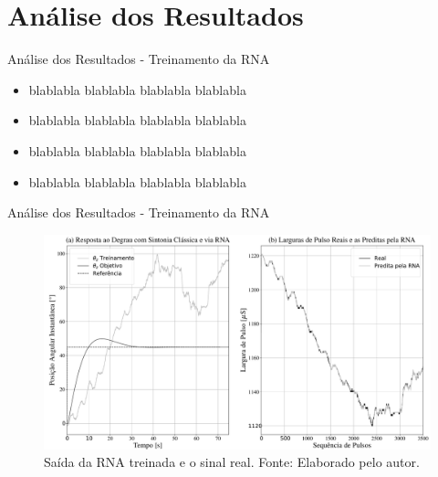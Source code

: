 \documentclass{beamer}
\begin{document}

\section{Análise dos Resultados}
\begin{frame}{Análise dos Resultados - Treinamento da RNA}
	\begin{itemize}
		\justifying
		\item blablabla blablabla blablabla blablabla 
		\item blablabla blablabla blablabla blablabla 
		\item blablabla blablabla blablabla blablabla 
		\item blablabla blablabla blablabla blablabla 
	\end{itemize}
\end{frame}


\begin{frame}{Análise dos Resultados - Treinamento da RNA}
     \begin{figure}[HT]
		\begin{center}
		\captionsetup{justification=centering}
        \includegraphics[scale=.22]{../resultados/img/neural_output}
        \caption{Saída da RNA treinada e o sinal real. \newline
        		 Fonte: Elaborado pelo autor.}
		\label{FIG_ADAPTATIVO}
        \end{center}
	\end{figure}
\end{frame}

\end{document}
